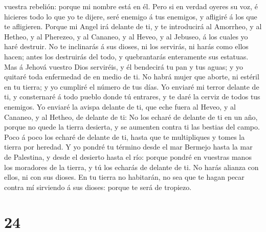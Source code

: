 vuestra rebelión: porque mi nombre está en él.  Pero si
en verdad oyeres su voz, é hicieres todo lo que yo te dijere, seré
enemigo á tus enemigos, y afligiré á los que te afligieren.
 Porque mi Angel irá delante de ti, y te introducirá al
Amorrheo, y al Hetheo, y al Pherezeo, y al Cananeo, y al Heveo, y al
Jebuseo, á los cuales yo haré destruir.  No te inclinarás
á sus dioses, ni los servirás, ni harás como ellos hacen; antes los
destruirás del todo, y quebrantarás enteramente sus estatuas.
 Mas á Jehová vuestro Dios serviréis, y él bendecirá tu
pan y tus aguas; y yo quitaré toda enfermedad de en medio de ti.
 No habrá mujer que aborte, ni estéril en tu tierra; y yo
cumpliré el número de tus días.  Yo enviaré mi terror
delante de ti, y consternaré á todo pueblo donde tú entrares, y te daré
la cerviz de todos tus enemigos.  Yo enviaré la avispa
delante de ti, que eche fuera al Heveo, y al Cananeo, y al Hetheo, de
delante de ti:  No los echaré de delante de ti en un año,
porque no quede la tierra desierta, y se aumenten contra ti las bestias
del campo.  Poco á poco los echaré de delante de ti,
hasta que te multipliques y tomes la tierra por heredad. 
Y yo pondré tu término desde el mar Bermejo hasta la mar de Palestina, y
desde el desierto hasta el río: porque pondré en vuestras manos los
moradores de la tierra, y tú los echarás de delante de ti.
 No harás alianza con ellos, ni con sus dioses.
 En tu tierra no habitarán, no sea que te hagan pecar
contra mí sirviendo á sus dioses: porque te será de tropiezo.

\hypertarget{section-23}{%
\section{24}\label{section-23}}

